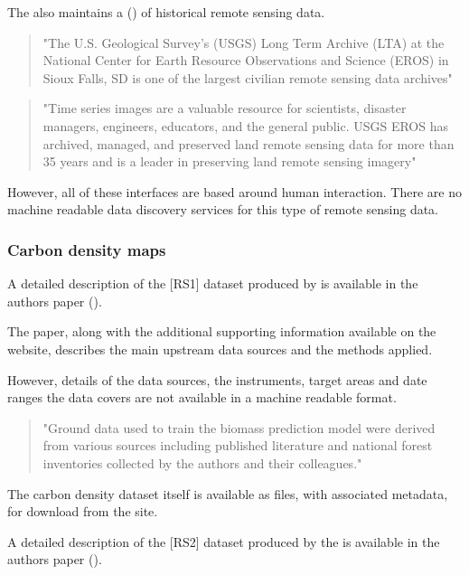 \documentclass{article}
\begin{document}
The \cite{usgs} also maintains a
 (\cite{usgs-lta})
of historical remote sensing data.

\begin{quote}
"The U.S. Geological Survey's (USGS) Long Term Archive (LTA) at the National Center
for Earth Resource Observations and Science (EROS) in Sioux Falls, SD is one of
the largest civilian remote sensing data archives"
\end{quote}

\begin{quote}
"Time series images are a valuable resource for scientists, disaster managers,
engineers, educators, and the general public. USGS EROS has archived, managed,
and preserved land remote sensing data for more than 35 years and is a leader
in preserving land remote sensing imagery"
\end{quote}

However, all of these interfaces are based around human interaction.
There are no machine readable data discovery services for this type of remote sensing data.

\subsubsection{Carbon density maps}

A detailed description of the [RS1] dataset produced by 
is available in the authors paper (\cite{saatchi-2011}).

The paper, along with the additional supporting information available on the
\cite{pnas} website, describes the main upstream data sources and the methods applied.

However, details of the data sources, the instruments, target areas and date ranges
the data covers are not available in a machine readable format.

\begin{quote}
"Ground data used to train the biomass prediction model were
derived from various sources including published literature
and national forest inventories collected by the authors
and their colleagues."
\end{quote}

The carbon density dataset itself is available as \cite{format-geotiff} files,
with associated \cite{format-world} metadata, for download from the
\cite{nasa-jpl-carbon-ftp} site.

A detailed description of the [RS2] dataset produced by the 
is available in the authors paper (\cite{baccini-2012}).
\end{document}

